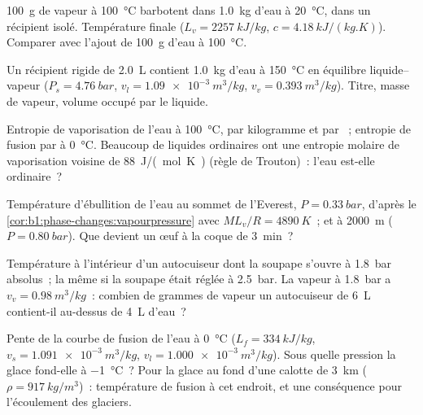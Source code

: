 \begin{exercise}[$\star$]\label{exo:b1:phase-changes:2}
\qty{100}{g} de vapeur à \qty{100}{\degreeCelsius} barbotent dans
\qty{1.0}{kg} d'eau à \qty{20}{\degreeCelsius}, dans un récipient isolé.
Température finale ($L_v = \qty{2257}{kJ/kg}$, $c = \qty{4.18}{kJ/(kg.K)}$).
Comparer avec l'ajout de \qty{100}{g} d'eau à \qty{100}{\degreeCelsius}.
\end{exercise}

\begin{exercise}[$\star$]\label{exo:b1:phase-changes:3}
Un récipient rigide de \qty{2.0}{L} contient \qty{1.0}{kg} d'eau à
\qty{150}{\degreeCelsius} en équilibre liquide--vapeur ($P_s =
\qty{4.76}{bar}$, $v_l = \qty{1.09e-3}{m^3/kg}$, $v_v = \qty{0.393}{m^3/kg}$).
Titre, masse de vapeur, volume occupé par le liquide.
\end{exercise}

\begin{exercise}[$\star$]\label{exo:b1:phase-changes:4}
Entropie de vaporisation de l'eau à \qty{100}{\degreeCelsius}, par kilogramme
et par ~; entropie de fusion par  à \qty{0}{\degreeCelsius}. Beaucoup
de liquides ordinaires ont une entropie molaire de vaporisation voisine de
\qty{88}{J/(mol.K)} (règle de Trouton)~: l'eau est-elle ordinaire~?
\end{exercise}

\begin{exercise}[$\star\star$]\label{exo:b1:phase-changes:5}
Température d'ébullition de l'eau au sommet de l'Everest, $P =
\qty{0.33}{bar}$, d'après le \cref{cor:b1:phase-changes:vapourpressure} avec
$ML_v/R = \qty{4890}{K}$~; et à \qty{2000}{m} ($P = \qty{0.80}{bar}$). Que
devient un œuf à la coque de \qty{3}{min}~?
\end{exercise}

\begin{exercise}[$\star\star$]\label{exo:b1:phase-changes:6}
Température à l'intérieur d'un autocuiseur dont la soupape s'ouvre à
\qty{1.8}{bar} absolus~; la même si la soupape était réglée à \qty{2.5}{bar}.
La vapeur à \qty{1.8}{bar} a $v_v = \qty{0.98}{m^3/kg}$~: combien de grammes
de vapeur un autocuiseur de \qty{6}{L} contient-il au-dessus de \qty{4}{L} d'eau~?
\end{exercise}

\begin{exercise}[$\star\star$]\label{exo:b1:phase-changes:7}
Pente de la courbe de fusion de l'eau à \qty{0}{\degreeCelsius} ($L_f =
\qty{334}{kJ/kg}$, $v_s = \qty{1.091e-3}{m^3/kg}$, $v_l = \qty{1.000e-3}{m^3/kg}$).
Sous quelle pression la glace fond-elle à \qty{-1}{\degreeCelsius}~? Pour la
glace au fond d'une calotte de \qty{3}{km} ($\rho = \qty{917}{kg/m^3}$)~:
température de fusion à cet endroit, et une conséquence pour l'écoulement des glaciers.
\end{exercise}

